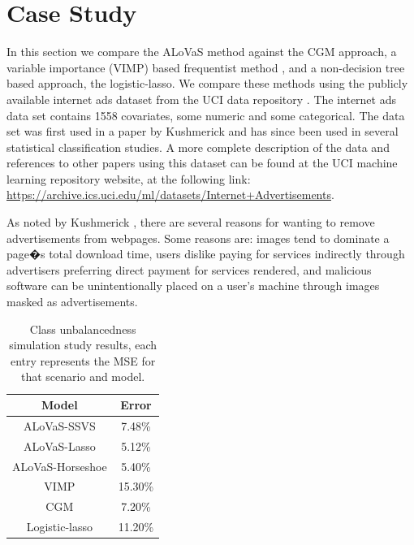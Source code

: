 \section{Case Study}\label{sec:real_data}

In this section we compare the ALoVaS method against the CGM approach, a variable importance (VIMP) based frequentist method \cite{ishwaran2010high}, and a non-decision tree based approach, the logistic-lasso. We compare these methods using the publicly available internet ads dataset from the UCI data repository \cite{Frank:2010uq}. The internet ads data set contains 1558 covariates, some numeric and some categorical. The data set was first used in a paper by Kushmerick \cite{kushmerick1999learning} and has since been used in several statistical classification studies. A more complete description of the data and references to other papers using this dataset can be found at the UCI machine learning repository website, at the following link: \url{https://archive.ics.uci.edu/ml/datasets/Internet+Advertisements}.

As noted by Kushmerick \cite{kushmerick1999learning}, there are several reasons for wanting to remove advertisements from webpages. Some reasons are: images tend to dominate a page�s total download time, users dislike paying for services indirectly through advertisers preferring direct payment for services rendered, and malicious software can be unintentionally placed on a user's machine through images masked as advertisements. 

		\begin{table}[H]
\begin{center}
\begin{tabular}{|c|c|} \hline
Model & Error \\ \hline
ALoVaS-SSVS&7.48\%\\ \hline
ALoVaS-Lasso &5.12\% \\ \hline
ALoVaS-Horseshoe&5.40\% \\ \hline
VIMP& 15.30\%\\ \hline
CGM&7.20\%\\ \hline
Logistic-lasso&11.20\%\\ \hline
\end{tabular}
\caption{Class unbalancedness simulation study results, each entry represents the MSE for that scenario and model. }
\label{tab:ads_misclass}
\end{center}
\end{table}

